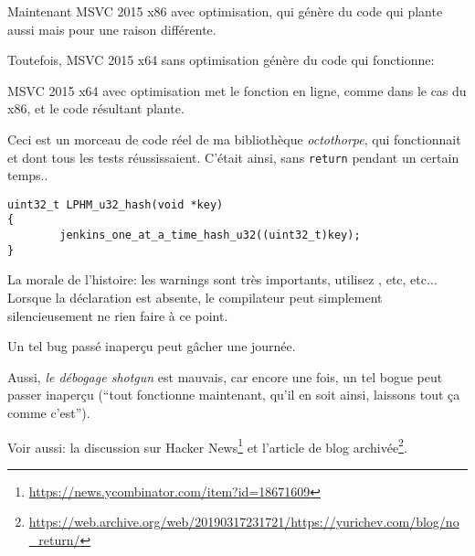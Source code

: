 Maintenant MSVC 2015 x86 avec optimisation, qui génère du code qui plante aussi mais
pour une raison différente.



Toutefois, MSVC 2015 x64 sans optimisation génère du code qui fonctionne:



MSVC 2015 x64 avec optimisation met le fonction en ligne, comme dans le cas du x86,
et le code résultant plante.

\myhrule{}

Ceci est un morceau de code réel de ma bibliothèque \emph{octothorpe},
qui fonctionnait et dont tous les tests réussissaient.
C'était ainsi, sans \verb|return| pendant un certain temps..

\begin{lstlisting}
uint32_t LPHM_u32_hash(void *key)
{
        jenkins_one_at_a_time_hash_u32((uint32_t)key);
}
\end{lstlisting}

\myhrule{}

La morale de l'histoire: les warnings sont très importants, utilisez , etc, etc...
Lorsque la déclaration  est absente, le compilateur peut simplement silencieusement
ne rien faire à ce point.

Un tel bug passé inaperçu peut gâcher une journée.

Aussi, \emph{le débogage shotgun}
est mauvais, car encore une fois, un tel bogue peut passer inaperçu (``tout fonctionne
maintenant, qu'il en soit ainsi, laissons tout ça comme c'est'').

Voir aussi: la discussion sur Hacker News\footnote{\url{https://news.ycombinator.com/item?id=18671609}}
et l'article de blog archivée\footnote{\url{https://web.archive.org/web/20190317231721/https://yurichev.com/blog/no_return/}}.

